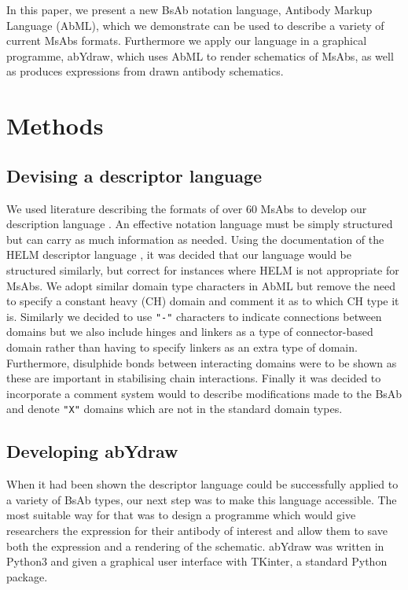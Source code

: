 \documentclass{article}
\begin{document}
In this paper, we present a new BsAb notation language, Antibody
Markup Language (AbML), which we demonstrate can be used to describe a
variety of current MsAbs formats. Furthermore we apply our language in
a graphical programme, abYdraw, which uses AbML to render schematics
of MsAbs, as well as produces expressions from drawn antibody
schematics.  

\section{Methods}

\subsection{Devising a descriptor language}
We used literature describing the formats of over 60 MsAbs to develop
our description language \cite{spiess:2015}. An effective notation
language must be simply structured but can carry as much information
as needed. Using the documentation of the HELM descriptor language
\cite{zhang:2012}, it was decided that our language would be
structured similarly, but correct for instances where HELM is not
appropriate for MsAbs. We adopt similar domain type characters in AbML
but remove the need to specify a constant heavy (CH) domain and
comment it as to which CH type it is. Similarly we decided to use \verb|"-"|
characters to indicate connections between domains but we also include
hinges and linkers as a type of connector-based domain rather than
having to specify linkers as an extra type of domain. Furthermore,
disulphide bonds between interacting domains were to be shown as these
are important in stabilising chain interactions. Finally it was
decided to incorporate a comment system would to describe
modifications made to the BsAb and denote \verb|"X"| domains which are not in
the standard domain types.  

\subsection{Developing abYdraw}
When it had been shown the descriptor language could be successfully
applied to a variety of  BsAb types, our next step was to make this
language accessible. The most suitable way for that was to design a
programme which would give researchers the expression for their
antibody of interest and allow them to save both the expression and a
rendering of the schematic. abYdraw was written in Python3 and given a
graphical user interface with TKinter, a standard Python package. 
\end{document}

